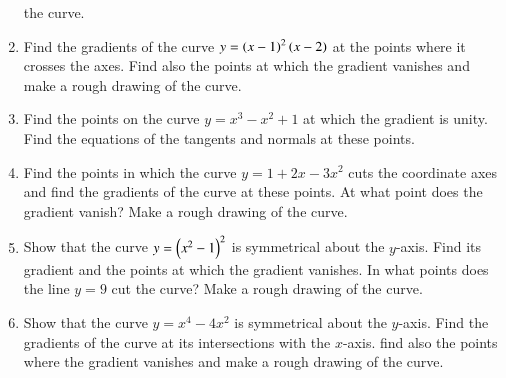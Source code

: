 \begin{enumerate}[label=\arabic*.,ref=\thesubsection.\theenumi]
the curve.
\item Find the gradients of the curve $y=\left(x-1\right)^2\left(x-2\right)$ at the points where it crosses the axes.  Find also the points
at which the gradient vanishes and make a rough drawing of the curve.
\item Find the points on the curve $y=x^3-x^2+1$ at which the gradient is unity.  Find the equations of the tangents
and normals at these points.
\item Find the points in which the curve $y=1+2x-3x^2$ cuts the coordinate axes and find the gradients of the curve
at these points.  At what point does the gradient vanish?  Make a rough drawing of the
curve.
\item Show that the curve $y=\left(x^2-1\right)^2$ is symmetrical about the $y$-axis.  Find its gradient and the points at which
the gradient vanishes.  In what points does the line $y=9$ cut the curve?  Make a rough drawing of the curve.
\item Show that the curve $y=x^4-4x^2$ is symmetrical about the $y$-axis.  Find the gradients of the curve
at its intersections with the $x$-axis.  find also the points where the gradient vanishes and make a
rough drawing of the curve.


\end{enumerate}
